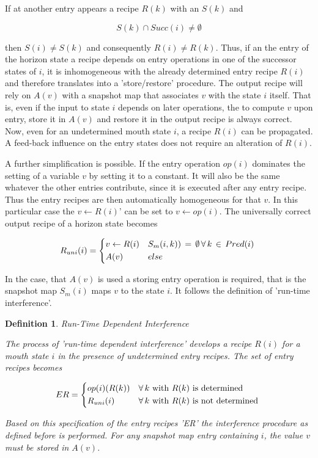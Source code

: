 \documentclass[12pt,a4paper]{scrartcl}
\newtheorem{definition}{Definition}
\begin{document}
If at another entry appears a recipe $R(k)$ with an $S(k)$ and 

\begin{equation}
              S(k) \cap Succ(i) \neq \emptyset
\end{equation}

then \(S(i) \neq S(k)\) and consequently \(R(i) \neq R(k)\). Thus, if an the entry of
the horizon state a recipe depends on entry operations in one of the successor
states of $i$, it is inhomogeneous with the already determined entry recipe
$R(i)$ and therefore translates into a 'store/restore' procedure. The output
recipe will rely on $A(v)$ with a snapshot map that associates $v$ with the
state $i$ itself. That is, even if the input to state $i$ depends on later
operations, the to compute $v$ upon entry, store it in $A(v)$ and restore it in
the output recipe is always correct. Now, even for an undetermined mouth state
$i$, a recipe $R(i)$ can be propagated.  A feed-back influence on the entry
states does not require an alteration of $R(i)$.

A further simplification is possible. If the entry operation $op(i)$ dominates
the setting of a variable $v$ by setting it to a constant.  It will also be the
same whatever the other entries contribute, since it is executed after any
entry recipe. Thus the entry recipes are then automatically homogeneous for
that $v$. In this particular case the $v \leftarrow R(i)$' can be set to $v \leftarrow
op(i)$.  The universally correct output recipe of a horizon state becomes 

\begin{equation}
    R_{uni}(i) = \begin{dcases*}
            v \leftarrow R(i) & $S_m(i,k))\,=\,\emptyset\,\forall\,k\,\in\,Pred(i)$ \\
            A(v)              & $else$
            \end{dcases*}
\end{equation}

In the case, that $A(v)$ is used a storing entry operation is required, that is
the snapshot map $S_m(i)$ maps $v$ to the state $i$. It follows the definition of
'run-time interference'.

\begin{definition}
Run-Time Dependent Interference

The process of 'run-time dependent interference' develops a recipe $R(i)$
for a mouth state $i$ in the presence of undetermined entry recipes. The
set of entry recipes becomes

\begin{equation}
    ER = \begin{dcases*}
            op(i)(R(k)) & $\forall\,k$ with $R(k)$ is determined \\
            R_{uni}(i)  & $\forall\,k$ with $R(k)$ is not determined
        \end{dcases*}
\end{equation}

Based on this specification of the entry recipes 'ER' the interference
procedure as defined before is performed. For any snapshot map entry
containing $i$, the value $v$ must be stored in $A(v)$.
\end{definition}
\end{document}
